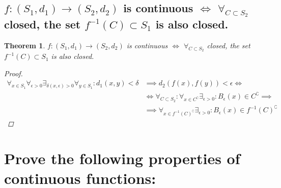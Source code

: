 \documentclass[]{article}
\newtheorem{theorem}{Theorem}
\begin{document}
\subsection{$f: (S_1,d_1) \to (S_2,d_2)$ is continuous $\iff$ $\forall_{C \subset S_2}$ closed, the set $f^{-1} (C) \subset S_1$ is also closed.}
\begin{theorem}
    $f: (S_1,d_1) \to (S_2,d_2)$ is continuous $\iff$ $\forall_{C \subset S_2}$ closed, the set $f^{-1} (C) \subset S_1$ is also closed.
    \begin{proof}
        \begin{align*}
            \forall_{x\in S_1} \forall_{\epsilon>0} \exists_{\delta(x,\epsilon)>0} \forall_{y\in S_1} : d_1(x,y) < \delta &\implies d_2(f(x),f(y)) < \epsilon \iff\\
            &\iff \forall_{C\subset S_2} : \forall_{x \in C^\complement} \exists_{\epsilon>0} : B_{\epsilon}(x) \in C^\complement \implies\\
            &\implies \forall_{x \in f^{-1}(C)^\complement} \exists_{\epsilon>0} : B_{\epsilon}(x) \in f^{-1}(C)^\complement
        \end{align*}
    \end{proof}
\end{theorem}













\newpage
\section{Prove the following properties of continuous functions:}

\end{document}
